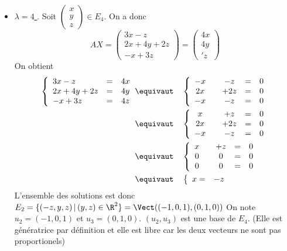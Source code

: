 \begin{correction}
\begin{enumerate}
\begin{itemize}
\item \underline{$\lambda =4$ }.  Soit $\left(\begin{array}{c}
x\\
y\\
z
\end{array} \right)\in E_4$. 
On a donc 
$$AX = \left(\begin{array}{c}
3x-z\\
2x+4y+2z\\
-x+3z
\end{array} \right) = \left(\begin{array}{c}
4x\\
4y\\
'z
\end{array} \right)$$
On obtient 
\begin{align*}
\left\{ 
\begin{array}{lcc}
3x-z &=&4x\\
2x+4y+2z &=& 4y\\
-x+3z &=& 4z
\end{array} \right. &\equivaut \quad \left\{ 
\begin{array}{ccccc}
-x& &-z &=&0\\
2x& &+2z &=& 0\\
-x& &-z &=& 0
\end{array} \right. \\
&\equivaut \quad \left\{ 
\begin{array}{ccccc}
x& &+z &=&0\\
2x& &+2z &=& 0\\
-x& &-z &=& 0
\end{array} \right. \\
&\equivaut \quad \left\{ 
\begin{array}{ccccc}
x& &+z &=&0\\
0& &0 &=& 0\\
0& &0 &=& 0
\end{array} \right.\\
&\equivaut \quad \left\{ 
\begin{array}{cc}
x=&-z\\
\end{array} \right. 
\end{align*}
L'ensemble des solutions est donc $E_2= \{ (-z,y,z) \, |\, (y,z)\in \R^2\} = \Vect( (-1,0,1), (0,1,0))$ 
On note $u_2 =(-1,0,1)$ et $u_3= (0,1,0)$. $(u_2, u_3) $ est une base de $E_4$. (Elle est génératrice par définition et elle est libre car les deux vecteurs ne sont pas proportionels) 
\end{itemize}

\end{enumerate}
\end{correction}
